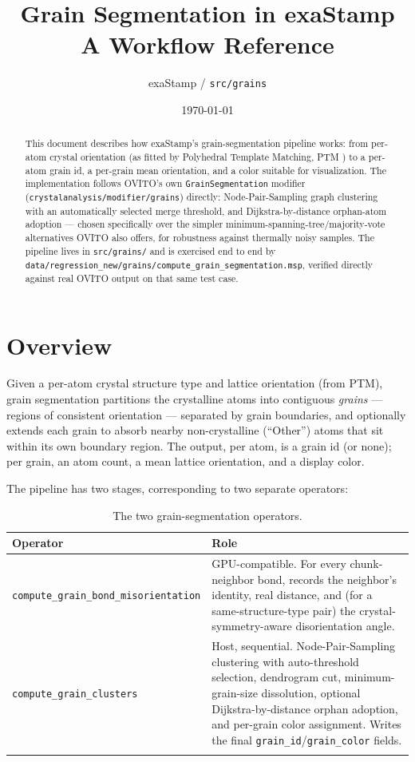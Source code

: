 \documentclass[11pt,a4paper]{article}
\title{Grain Segmentation in exaStamp\\
\large A Workflow Reference}
\author{exaStamp / \texttt{src/grains}}
\date{\today}
\newcommand{\op}[1]{\texttt{#1}}
\newcommand{\field}[1]{\texttt{#1}}
\newcommand{\code}[1]{\texttt{#1}}
\begin{document}
\maketitle

\begin{abstract}
This document describes how exaStamp's grain-segmentation pipeline works: from per-atom crystal
orientation (as fitted by Polyhedral Template Matching, PTM \cite{ptm2016}) to a per-atom grain id,
a per-grain mean orientation, and a color suitable for visualization. The implementation follows
OVITO's own \code{GrainSegmentation} modifier (\code{crystalanalysis/modifier/grains}) directly:
Node-Pair-Sampling graph clustering with an automatically selected merge threshold, and
Dijkstra-by-distance orphan-atom adoption — chosen specifically over the simpler
minimum-spanning-tree/majority-vote alternatives OVITO also offers, for robustness against
thermally noisy samples. The pipeline lives in \texttt{src/grains/} and is exercised end to end by
\texttt{data/regression\_new/grains/compute\_grain\_segmentation.msp}, verified directly against
real OVITO output on that same test case.
\end{abstract}

\tableofcontents

\section{Overview}

Given a per-atom crystal structure type and lattice orientation (from PTM), grain segmentation
partitions the crystalline atoms into contiguous \emph{grains} — regions of consistent
orientation — separated by grain boundaries, and optionally extends each grain to absorb nearby
non-crystalline (``Other'') atoms that sit within its own boundary region. The output, per atom, is
a grain id (or none); per grain, an atom count, a mean lattice orientation, and a display color.

The pipeline has two stages, corresponding to two separate operators:

\begin{longtable}{@{}p{}p{}@{}}
\hline
\textbf{Operator} & \textbf{Role} \\
\hline
\op{compute\_grain\_bond\_misorientation} &
  GPU-compatible. For every chunk-neighbor bond, records the neighbor's identity, real distance,
  and (for a same-structure-type pair) the crystal-symmetry-aware disorientation angle. \\
\op{compute\_grain\_clusters} &
  Host, sequential. Node-Pair-Sampling clustering with auto-threshold selection, dendrogram cut,
  minimum-grain-size dissolution, optional Dijkstra-by-distance orphan adoption, and per-grain
  color assignment. Writes the final \field{grain\_id}/\field{grain\_color} fields. \\
\hline
\caption{The two grain-segmentation operators.}
\label{tab:pipeline}
\end{longtable}
\end{document}

